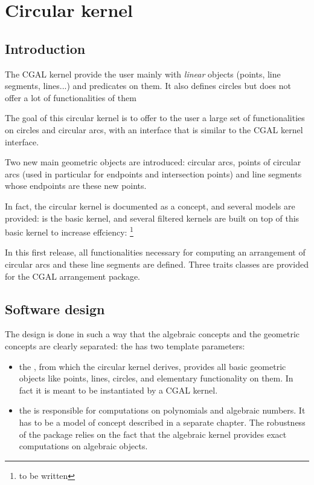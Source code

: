 \chapter{Circular kernel}
\label{chapter-circular-kernel}


\section{Introduction}

The CGAL kernel provide the user mainly with \textit{linear} objects
(points, line segments, lines...) and predicates on them. It also
defines circles but does not offer a lot of functionalities of them

The goal of this circular kernel is to offer to the user a large set
of functionalities on circles and circular arcs, with an interface
that is similar to the CGAL kernel interface. 

Two new main geometric objects are introduced: circular arcs, points
of circular arcs (used in particular for endpoints and intersection
points) and line segments whose endpoints are these new points.  

In fact, the circular kernel is documented as a concept, and several
models are provided:  is the basic kernel, and
several filtered kernels are built on top of this basic kernel to
increase effciency: \footnote{to be written}

In this first release, all functionalities necessary for computing an
arrangement of circular arcs and these line segments are
defined. Three traits classes are provided for the CGAL arrangement
package. 

\section{Software design}

The design is done in such a way that the algebraic concepts and the
geometric concepts are clearly separated: the 
has two template parameters: 
\begin{itemize}
\item {} the , from which the circular kernel derives,
provides all basic geometric objects like points, lines, circles, and
elementary functionality on them. In fact it is meant to be
instantiated by a CGAL kernel. 
\item {} the  is responsible for computations on
polynomials and algebraic numbers. It has to be a model of concept 
 described in a separate chapter. The
robustness of the package relies on the fact that the algebraic kernel
provides exact computations on algebraic objects.
\end{itemize}

